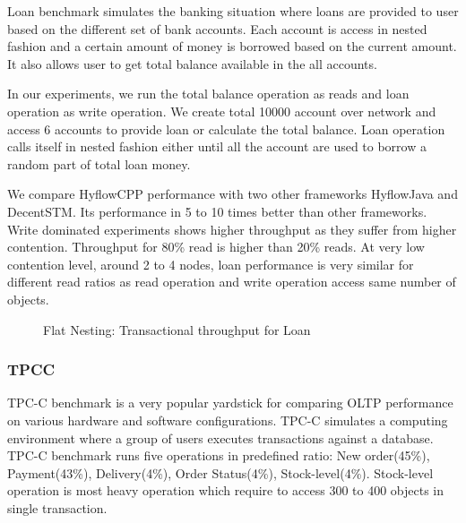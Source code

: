 \documentclass[12pt,english]{report}
\begin{document}
Loan benchmark simulates the banking situation where loans are provided to user based on the different set of bank accounts. Each account is access in nested fashion and a certain amount of money is borrowed based on the current amount. It also allows user to get total balance available in the all accounts.

In our experiments, we run the total balance operation as reads and loan operation as write operation. We create total 10000 account over network and access 6 accounts to provide loan or calculate the total balance.
Loan operation calls itself in nested fashion either until all the account are used to borrow a random part of total loan money.

We compare HyflowCPP performance with two other frameworks HyflowJava and DecentSTM. Its performance in 5 to 10 times better than other frameworks. Write dominated experiments shows higher throughput as they suffer from higher contention. Throughput for 80\% read is higher than 20\% reads. At very low contention level, around 2 to 4 nodes, loan performance is very similar for different read ratios as read operation and write operation access same number of objects. 

\begin{figure}[H]
\centering
{}
\end{figure}
\begin{figure}[H]
\centering
{}
\end{figure}

\begin{figure}[H]
\centering
{}
\caption{Flat Nesting: Transactional throughput for Loan}
\label{Fig:flatLoan}
\end{figure}

\subsubsection{TPCC}

TPC-C benchmark is a very popular yardstick for comparing OLTP performance on various hardware and software configurations. TPC-C simulates a computing environment where a group of users executes transactions against a database. TPC-C benchmark runs five operations in predefined ratio: New order(45\%), Payment(43\%), Delivery(4\%), Order Status(4\%), Stock-level(4\%). Stock-level operation is most heavy operation which require to access 300 to 400 objects in single transaction. 
\end{document}
